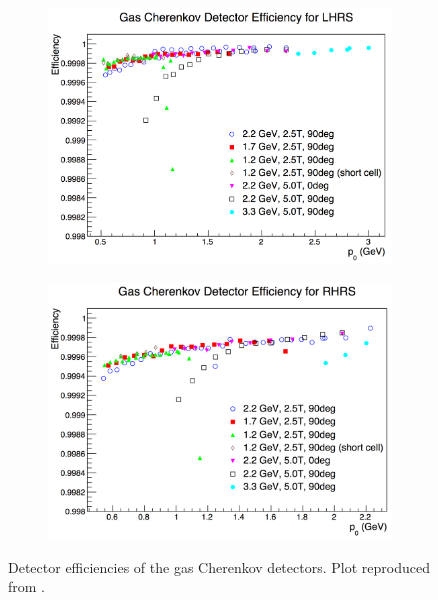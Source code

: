 \begin{figure}[tb!]
  \centering
  \begin{subfigure}[t]{0.49\textwidth}
    \includegraphics[width=\textwidth]{figs/Cherenkov-efficiency-left.png}
  \end{subfigure}
  \begin{subfigure}[t]{0.49\textwidth}
    \includegraphics[width=\textwidth]{figs/Cherenkov-efficiency-right.png}
  \end{subfigure}
  \caption[Detector efficiencies of the gas Cherenkov detectors.]{Detector efficiencies of the gas Cherenkov detectors. Plot reproduced from \cite{Cummings2013}. \label{C7S2F3}}
\end{figure}

